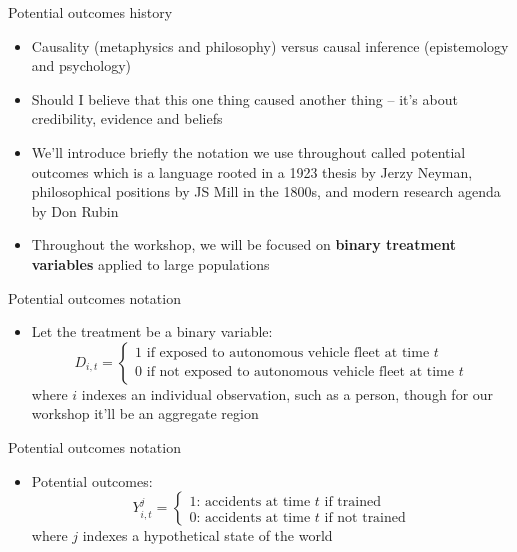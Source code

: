 \documentclass{beamer}
\begin{document}
\begin{frame}{Potential outcomes history}

\begin{itemize}

\item Causality (metaphysics and philosophy) versus causal inference (epistemology and psychology)
\item Should I believe that this one thing caused another thing -- it's about credibility, evidence and beliefs
\item We'll introduce briefly the notation we use throughout called potential outcomes which is a language rooted in a 1923 thesis by Jerzy Neyman, philosophical positions by JS Mill in the 1800s, and modern research agenda by Don Rubin
\item Throughout the workshop, we will be focused on \textbf{binary treatment variables} applied to large populations
\end{itemize}

\end{frame}




\begin{frame}{Potential outcomes notation}
	
	\begin{itemize}
	\item Let the treatment be a binary variable: $$D_{i,t} =\begin{cases} 1 \text{ if exposed to autonomous vehicle fleet at time $t$} \\ 0 \text{ if not exposed to autonomous vehicle fleet at time $t$} \end{cases}$$where $i$ indexes an individual observation, such as a person, though for our workshop it'll be an aggregate region

	\end{itemize}
\end{frame}

\begin{frame}{Potential outcomes notation}
	
	\begin{itemize}

	\item Potential outcomes: $$Y_{i,t}^j =\begin{cases} 1 \text{: accidents at time $t$ if trained} \\ 0 \text{: accidents at time $t$ if not trained} \end{cases}$$where $j$ indexes a hypothetical state of the world 

	\end{itemize}
\end{frame}
\end{document}
